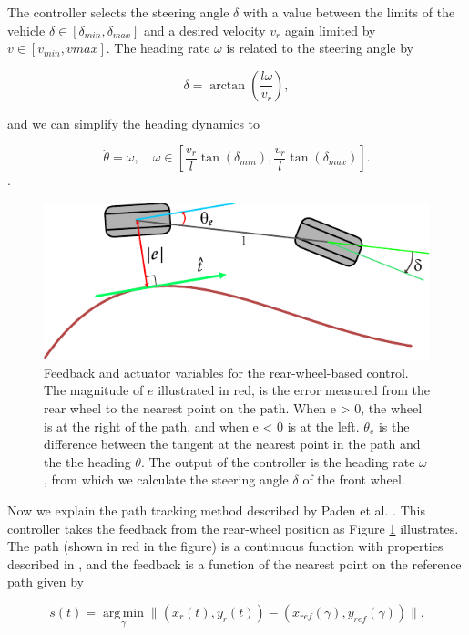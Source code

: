 \documentclass[symmetry,article,submit,moreauthors,pdftex]{Definitions/mdpi}
\begin{document}
The controller selects the steering angle $\delta$ with a value between the
limits of the vehicle $\delta \in [\delta_{min},\delta_{max}]$ and a desired
velocity $v_r$ again limited by $v\in [v_{min},v{max}]$. The heading rate
$\omega$ is related to the steering angle by 

\begin{equation}
       \delta = \arctan \left(\frac{l\omega}{v_r}\right),
\end{equation}

and we can simplify the heading dynamics to 

\begin{equation}
    \dot{\theta} = \omega,\quad \omega \in \left[\frac{v_r}{l} \tan(\delta_{min}),\frac{v_r}{l} \tan(\delta_{max} ) \right].
\end{equation}.

\begin{figure}[H] \includegraphics[width=10.5 cm]{img/path} \caption{ Feedback
        and actuator variables for the rear-wheel-based control. The magnitude
        of $e$ illustrated in red, is the error measured from the rear wheel to
        the nearest point on the path. When e > 0, the wheel is at the right of
        the path, and when e < 0 is at the left. $\theta_e$ is the
        difference between the tangent at the nearest point in the path and the
        the heading $\theta$. The output of the controller is the heading rate
        $\omega$, from which we calculate the steering angle $\delta$ of the front wheel.
}\label{fig:kinematics}    \end{figure} 

Now we explain the path tracking method described by Paden et al.
\cite{paden_survey_2016}.  This controller takes the feedback from the
rear-wheel position as Figure \ref{fig:kinematics} illustrates.  The path
(shown in red in the figure) is a continuous function with properties
described in \cite{samson1992path}, and the feedback is a function of the
nearest point on the reference path given by 

\begin{equation}
s(t) = \operatorname*{arg\,min}_{\gamma} \|(x_r(t),y_r(t)) - (x_{ref}(\gamma),y_{ref}(\gamma)) \|.
\end{equation}
\end{document}
